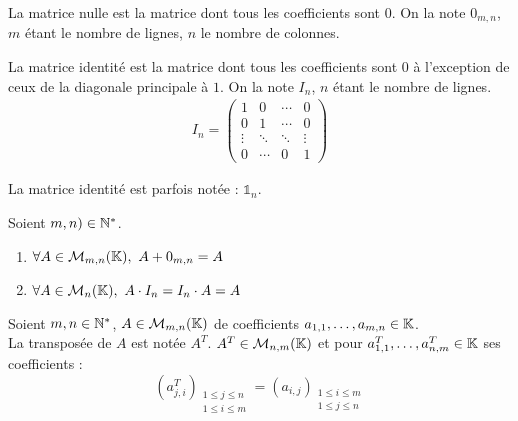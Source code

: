 \begin{definition}
	La matrice nulle est la matrice dont tous les coefficients sont $0$. On la note $0_{m,n}$, $m$ étant le nombre de lignes, $n$ le nombre de colonnes. 
\end{definition}

\begin{definition}
	La matrice identité est la matrice dont tous les coefficients sont $0$ à l'exception de ceux de la diagonale principale à $1$. On la note $I_n$, $n$ étant le nombre de lignes.
	\begin{align*}
		I_n = 
		\begin{pmatrix}
			1 & 0 & \cdots & 0 \\
			0 & 1 & \cdots & 0 \\
			\vdots & \ddots & \ddots & \vdots \\
			0 & \cdots & 0 & 1
		\end{pmatrix}
	\end{align*}
\end{definition}

\begin{remark}
    La matrice identité est parfois notée : $\mathds{1}_n$.
\end{remark}

\begin{lemma}
	Soient $m,n) \in \mathbb{N}^*$.
	\begin{multicols}{2}
	    \begin{enumerate}
    		\item $\forall A \in \mathcal{M}_{m, n}(\K),\ A + 0_{m,n} = A$
    		\item $\forall A \in \mathcal{M}_{n}(\mathbb{K}),\ A \cdot I_n = I_n \cdot A = A$
    	\end{enumerate}
	\end{multicols}
\end{lemma}

\begin{definition}[Transposée]
	Soient $m, n \in \mathbb{N}^*$, $A \in \mathcal{M}_{m, n}(\mathbb{K})$ de coefficients $a_{1,1}, \ldots, a_{m,n} \in \mathbb{K}$.
	\\
	La transposée de $A$ est notée $A^T$. $A^T \in \mathcal{M}_{n,m}(\mathbb{K})$ et pour $a^T_{1,1}, \ldots, a^T_{n,m} \in \mathbb{K}$ ses coefficients :
	\[ (a^T_{j,i})_{\substack{1 \leq j \leq n \\ 1 \leq i \leq m}} = (a_{i,j})_{\substack{1 \leq i \leq m \\ 1 \leq j \leq n}} \]
\end{definition}

